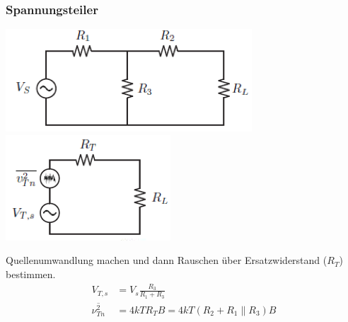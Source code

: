 \subsubsection{Spannungsteiler}
\begin{minipage}{0.4\textwidth}
	\includegraphics[scale=0.5]{pictures/seriewiderstand1}\\
	\includegraphics[scale=0.5]{pictures/seriewiderstand2}
\end{minipage}
\begin{minipage}{0.6\textwidth}
	Quellenumwandlung machen und dann Rauschen über Ersatzwiderstand ($R_T$) bestimmen.
	\begin{align*}
		V_{T,s}&=V_{s}\frac{R_{3}}{R_{1}+R_{3}}\\
		\overline{\nu^2_{Tn}}&=4kTR_{T}B=4kT(R_{2}+R_{1}\parallel R_{3})B
	\end{align*}
\end{minipage}

